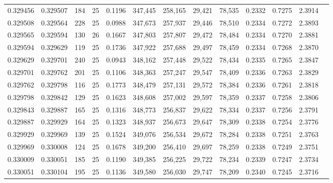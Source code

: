 \begin{tabular}{rrrrrrrrrrrrr}
0.329456 & 0.329507 &   184 &  25 &                                     0.1196 & 347,445 & 258,165 &  29,421 &  78,535 & 0.2332 & 0.7275 & 2.3914 \\
0.329508 & 0.329564 &   228 &  25 &                                     0.0988 & 347,673 & 257,937 &  29,446 &  78,510 & 0.2334 & 0.7272 & 2.3893 \\
0.329565 & 0.329594 &   130 &  26 &                                     0.1667 & 347,803 & 257,807 &  29,472 &  78,484 & 0.2334 & 0.7270 & 2.3881 \\
0.329594 & 0.329629 &   119 &  25 &                                     0.1736 & 347,922 & 257,688 &  29,497 &  78,459 & 0.2334 & 0.7268 & 2.3870 \\
0.329629 & 0.329701 &   240 &  25 &                                     0.0943 & 348,162 & 257,448 &  29,522 &  78,434 & 0.2335 & 0.7265 & 2.3847 \\
0.329701 & 0.329762 &   201 &  25 &                                     0.1106 & 348,363 & 257,247 &  29,547 &  78,409 & 0.2336 & 0.7263 & 2.3829 \\
0.329762 & 0.329798 &   116 &  25 &                                     0.1773 & 348,479 & 257,131 &  29,572 &  78,384 & 0.2336 & 0.7261 & 2.3818 \\
0.329798 & 0.329842 &   129 &  25 &                                     0.1623 & 348,608 & 257,002 &  29,597 &  78,359 & 0.2337 & 0.7258 & 2.3806 \\
0.329843 & 0.329887 &   165 &  25 &                                     0.1316 & 348,773 & 256,837 &  29,622 &  78,334 & 0.2337 & 0.7256 & 2.3791 \\
0.329887 & 0.329929 &   164 &  25 &                                     0.1323 & 348,937 & 256,673 &  29,647 &  78,309 & 0.2338 & 0.7254 & 2.3776 \\
0.329929 & 0.329969 &   139 &  25 &                                     0.1524 & 349,076 & 256,534 &  29,672 &  78,284 & 0.2338 & 0.7251 & 2.3763 \\
0.329969 & 0.330008 &   124 &  25 &                                     0.1678 & 349,200 & 256,410 &  29,697 &  78,259 & 0.2338 & 0.7249 & 2.3751 \\
0.330009 & 0.330051 &   185 &  25 &                                     0.1190 & 349,385 & 256,225 &  29,722 &  78,234 & 0.2339 & 0.7247 & 2.3734 \\
0.330051 & 0.330104 &   195 &  25 &                                     0.1136 & 349,580 & 256,030 &  29,747 &  78,209 & 0.2340 & 0.7245 & 2.3716 \\

\end{tabular}
